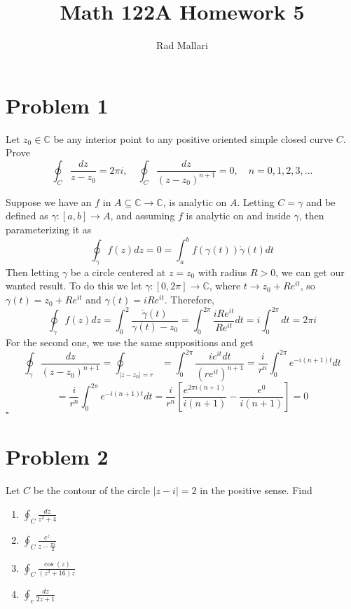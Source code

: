\documentclass[12pt]{article}
\title{Math 122A Homework 5}
\author{Rad Mallari}
\newcommand{\C}{\mathbb{C}}
\newenvironment{proof}{\noindent{\bf Proof.}}{\hfill $\square$\medskip}
\begin{document}
\maketitle

\section{Problem 1}
Let $z_{0}\in\C$ be any interior point to any positive oriented simple closed curve $C$.
Prove
$$\oint_{C}\frac{dz}{z-z_{0}}=2\pi i,\quad\oint_{C}\frac{dz}{(z-z_{0})^{n+1}}=0, \quad n=0,1,2,3,...$$

\begin{proof}
Suppose we have an $f$ in $A\subseteq\C\to\C$, is analytic on $A$. Letting $C=\gamma$ and be defined as $\gamma:[a,b]\to A$, and assuming $f$ is analytic on and inside $\gamma$, then parameterizing it as
$$\oint_{\gamma}f(z)dz=0=\int_{a}^{b}f(\gamma(t))\dot{\gamma}(t)dt$$
Then letting $\gamma$ be a circle centered at $z=z_{0}$ with radius $R>0$, we can get our wanted result. To do this we let $\gamma:[0,2\pi]\to\C$, where $t\to z_{0}+Re^{it}$, so $\gamma(t)=z_{0}+Re^{it}$ and $\dot{\gamma(t)}=iRe^{it}$. Therefore,
$$\oint_{\gamma}f(z)dz=\int_{0}^{2}\frac{\dot{\gamma}(t)}{\gamma(t)-z_{0}}=\int_{0}^{2\pi}\frac{iRe^{it}}{Re^{it}}dt=i\int_{0}^{2\pi}dt=2\pi i$$
For the second one, we use the same suppositions and get
$$\oint_{\gamma}\frac{dz}{(z-z_{0})^{n+1}}=\oint_{|z-z_{0}|=r}=\int_{0}^{2\pi}\frac{ie^{it}dt}{(re^{it})^{n+1}}=\frac{i}{r^{n}}\int_{0}^{2\pi}e^{-i(n+1)t}dt$$
$$=\frac{i}{r^{n}}\int_{0}^{2\pi}e^{-i(n+1)t}dt=\frac{i}{r^{n}}\left[\frac{e^{2\pi i(n+1)}}{i(n+1)}-\frac{e^{0}}{i(n+1)}\right ]=0$$
\end{proof}


\section{Problem 2}
Let $C$ be the contour of the circle $\left |z-i\right |=2$ in the positive sense. Find
\begin{enumerate}[align=left, label=\textbf{(\alph*)}]
    \item $\oint_{C}\frac{dz}{z^{2}+4}$
    \item $\oint_{C}\frac{e^{z}}{z-\frac{\pi i}{2}}$
    \item $\oint_{C}\frac{\cos(z)}{(z^{2}+16)z}$
    \item $\oint_{c}\frac{dz}{2z+1}$
\end{enumerate}
\end{document}
